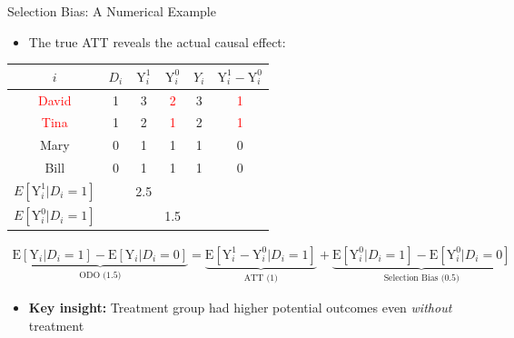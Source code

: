 \documentclass[hyperref={pdfpagelabels=false}]{beamer}
\begin{document}
	\begin{frame}{Selection Bias: A Numerical Example}
		\begin{itemize}
			\item The true ATT reveals the actual causal effect:
		\end{itemize}
		\begin{center}
			\begin{threeparttable}
				\centering\footnotesize
				\begin{tabular}{cccccc}
					\toprule
					$i$ & $D_i$ & $\mathrm{Y}^{1}_{i}$ & $\mathrm{Y}^{0}_{i}$ & $Y_i$ & $\mathrm{Y}^{1}_{i}-\mathrm{Y}^{0}_{i}$ \\
					\midrule
					\textcolor{red}{David} & 1 & 3 & \textcolor{red}{2} & 3 & \textcolor{red}{1} \\
					\textcolor{red}{Tina}  & 1 & 2 & \textcolor{red}{1} & 2 & \textcolor{red}{1} \\
					Mary  & 0 & 1 & 1 & 1 & 0 \\
					Bill  & 0 & 1 & 1 & 1 & 0 \\
					\midrule
					$E[\mathrm{Y}^{1}_{i}| D_i=1]$ & & 2.5 & & & \\
					$E[\mathrm{Y}^{0}_{i}| D_i=1]$ & & & 1.5 & & \\
					\bottomrule
				\end{tabular}
			\end{threeparttable}
		\end{center}
		\vspace{0.1cm}
		\begin{equation*}
			\begin{aligned}
				\underbrace{\mathrm{E}[\mathrm{Y}_{i}|D_i=1] - \mathrm{E}[\mathrm{Y}_{i}|D_i=0]}_{\text{ODO (1.5)}}
				= \underbrace{\mathrm{E}[\mathrm{Y}^{1}_{i}-\mathrm{Y}^{0}_{i}|D_i=1]}_{\text{ATT (1)}} + \underbrace{\mathrm{E}[\mathrm{Y}^{0}_{i}|D_i=1]-\mathrm{E}[\mathrm{Y}^{0}_{i}|D_i=0]}_{\text{Selection Bias (0.5)}}
			\end{aligned}
		\end{equation*}
		\begin{itemize}
			\item \textbf{Key insight:} Treatment group had higher potential outcomes even \emph{without} treatment
		\end{itemize}
	\end{frame}
	
\end{document}
